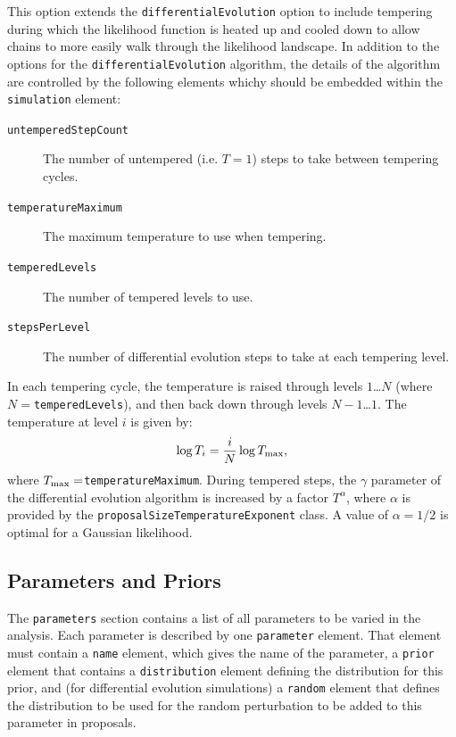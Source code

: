 This option extends the {\tt differentialEvolution} option to include tempering during which the likelihood function is heated up and cooled down to allow chains to more easily walk through the likelihood landscape. In addition to the options for the {\tt differentialEvolution} algorithm, the details of the algorithm are controlled by the following elements whichy should be embedded within the {\tt simulation} element:
\begin{description}
\item[{\tt untemperedStepCount}] The number of untempered (i.e. $T=1$) steps to take between tempering cycles.
\item[{\tt temperatureMaximum}] The maximum temperature to use when tempering.
\item[{\tt temperedLevels}] The number of tempered levels to use.
\item[{\tt stepsPerLevel}] The number of differential evolution steps to take at each tempering level.
\end{description}

In each tempering cycle, the temperature is raised through levels $1$\ldots$N$ (where $N=${\tt temperedLevels}), and then back down through levels $N-1$\ldots$1$. The temperature at level $i$ is given by:
\begin{equation}
\log T_i = {i \over N} \log T_{\rm max},
\end{equation}
where $T_{\rm max}=${\tt temperatureMaximum}. During tempered steps, the $\gamma$ parameter of the differential evolution algorithm is increased by a factor $T^\alpha$, where $\alpha$ is provided by the {\tt proposalSizeTemperatureExponent} class. A value of $\alpha=1/2$ is optimal for a Gaussian likelihood.

\subsection{Parameters and Priors}\label{sec:ParametersPriors}

The {\tt parameters} section contains a list of all parameters to be varied in the analysis. Each parameter is described by one {\tt parameter} element. That element must contain a {\tt name} element, which gives the name of the parameter, a {\tt prior} element that contains a {\tt distribution} element defining the distribution for this prior, and (for differential evolution simulations) a {\tt random} element that defines the distribution to be used for the random perturbation to be added to this parameter in proposals.

